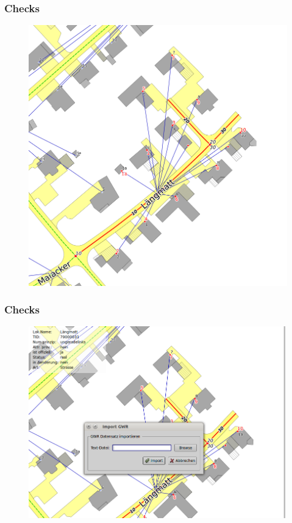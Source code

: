 \documentclass{beamer}
\begin{document}
\begin{frame}
  \frametitle{Checks}
  \begin{figure}
    \includegraphics[scale=0.3]{bilder/veriso_f12.png}
  \end{figure}
\end{frame}

\begin{frame}
  \frametitle{Checks}
  \begin{figure}
    \includegraphics[scale=0.3]{bilder/veriso_gwr_import.png}
  \end{figure}
\end{frame}
\end{document}
